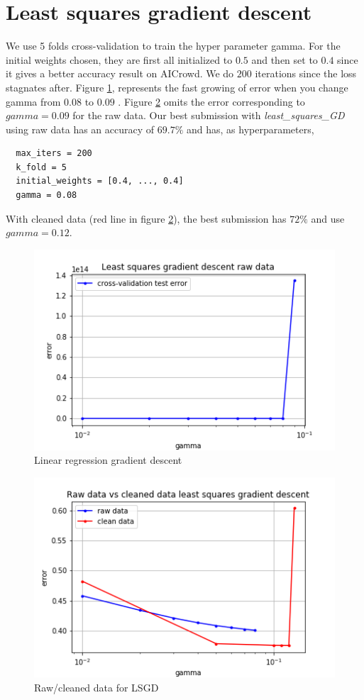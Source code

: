 \documentclass[11pt, a4paper, twocolumn]{article}
\begin{document}
\section{Least squares gradient descent}
We use 5 folds cross-validation
to train the hyper parameter gamma.
For the initial weights chosen, they are first all initialized to $0.5$ and then set to $0.4$ 
since it gives a better accuracy result on AICrowd.
We do $200$ iterations since the loss stagnates after.
Figure \ref{fig:lsgd}, 
represents the fast growing of error 
when you change gamma from $0.08$ to $0.09$ .
Figure \ref{fig:raw_clean_lsgd} omits the error corresponding to $gamma = 0.09$ for the raw data.
Our best submission with \textit{least\_squares\_GD} using raw data 
has an accuracy of $69.7\%$ and has, as hyperparameters,
\begin{lstlisting}
  max_iters = 200
  k_fold = 5
  initial_weights = [0.4, ..., 0.4]
  gamma = 0.08
\end{lstlisting}
With cleaned data (red line in figure \ref{fig:raw_clean_lsgd}), 
the best submission has $72\%$ and use $gamma = 0.12$.

\begin{figure}[h!]
  \includegraphics[width=\linewidth]{raw_data_least_squares_GD.png}
  \caption{Linear regression gradient descent}
  \label{fig:lsgd}
\end{figure}
\begin{figure}[h!]
  \includegraphics[width=\linewidth]{raw_vs_clean_lsgd.png}
  \caption{Raw/cleaned data for LSGD}
    \label{fig:raw_clean_lsgd}
\end{figure}
\end{document}
